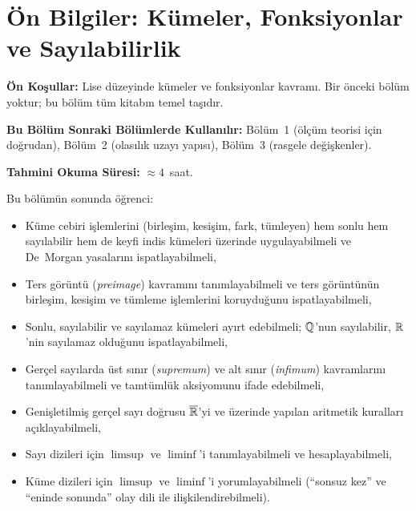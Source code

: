 
\chapter{Ön Bilgiler: Kümeler, Fonksiyonlar ve Sayılabilirlik}


\noindent\textbf{Ön Koşullar:} Lise düzeyinde kümeler ve fonksiyonlar kavramı.
Bir önceki bölüm yoktur; bu bölüm tüm kitabın temel taşıdır.

\noindent\textbf{Bu Bölüm Sonraki Bölümlerde Kullanılır:}
Bölüm~1 (ölçüm teorisi için doğrudan),
Bölüm~2 (olasılık uzayı yapısı),
Bölüm~3 (rasgele değişkenler).

\noindent\textbf{Tahmini Okuma Süresi:} $\approx 4$~saat.

\vspace{0.5\baselineskip}

\begin{kazanimlar}
Bu bölümün sonunda öğrenci:
\begin{itemize}
  \item Küme cebiri işlemlerini (birleşim, kesişim, fark, tümleyen) hem
        sonlu hem sayılabilir hem de keyfi indis kümeleri üzerinde
        uygulayabilmeli ve De~Morgan yasalarını ispatlayabilmeli,
  \item Ters görüntü (\emph{preimage}) kavramını tanımlayabilmeli ve ters
        görüntünün birleşim, kesişim ve tümleme işlemlerini koruyduğunu
        ispatlayabilmeli,
  \item Sonlu, sayılabilir ve sayılamaz kümeleri ayırt edebilmeli;
        $\mathbb{Q}$'nun sayılabilir, $\mathbb{R}$'nin sayılamaz olduğunu ispatlayabilmeli,
  \item Gerçel sayılarda üst sınır (\emph{supremum}) ve alt sınır
        (\emph{infimum}) kavramlarını tanımlayabilmeli ve tamtümlük
        aksiyomunu ifade edebilmeli,
  \item Genişletilmiş gerçel sayı doğrusu $\overline{\mathbb{R}}$'yi
        ve üzerinde yapılan aritmetik kuralları açıklayabilmeli,
  \item Sayı dizileri için $\limsup$ ve $\liminf$'i tanımlayabilmeli ve
        hesaplayabilmeli,
  \item Küme dizileri için $\limsup$ ve $\liminf$'i yorumlayabilmeli
        (``sonsuz kez'' ve ``eninde sonunda'' olay dili ile ilişkilendirebilmeli).
\end{itemize}
\end{kazanimlar}

